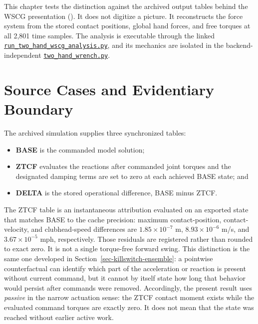\documentclass[
  letterpaper,
]{report}
\providecommand{\tightlist}{%
  \setlength{\itemsep}{0pt}\setlength{\parskip}{0pt}}
\begin{document}
This chapter tests the distinction against the archived output tables
behind the WSCG presentation ().
It does not digitize a picture. It reconstructs the force system from
the stored contact positions, global hand forces, and free torques at
all 2,801 time samples. The analysis is executable through the linked
\href{https://github.com/D-sorganization/UpstreamDrift/blob/main/scripts/research/proximal_distal_energy/run_two_hand_wscg_analysis.py}{\texttt{run\_two\_hand\_wscg\_analysis.py}},
and its mechanics are isolated in the backend-independent
\href{https://github.com/D-sorganization/UpstreamDrift/blob/main/scripts/research/proximal_distal_energy/two_hand_wrench.py}{\texttt{two\_hand\_wrench.py}}.

\section{Source Cases and Evidentiary
Boundary}\label{sec-two-hand-source-cases}

The archived simulation supplies three synchronized tables:

\begin{itemize}
\tightlist
\item
  \textbf{BASE} is the commanded model solution;
\item
  \textbf{ZTCF} evaluates the reactions after commanded joint torques
  and the designated damping terms are set to zero at each achieved BASE
  state; and
\item
  \textbf{DELTA} is the stored operational difference, BASE minus ZTCF.
\end{itemize}

The ZTCF table is an instantaneous attribution evaluated on an exported
state that matches BASE to the cache precision: maximum
contact-position, contact-velocity, and clubhead-speed differences are
\(1.85\times10^{-7}\) m, \(8.93\times10^{-6}\) m/s, and
\(3.67\times10^{-5}\) mph, respectively. Those residuals are registered
rather than rounded to exact zero. It is not a single torque-free
forward swing. This distinction is the same one developed in
Section~\ref{sec-killswitch-ensemble}: a pointwise counterfactual can
identify which part of the acceleration or reaction is present without
current command, but it cannot by itself state how long that behavior
would persist after commands were removed. Accordingly, the present
result uses \emph{passive} in the narrow actuation sense: the ZTCF
contact moment exists while the evaluated command torques are exactly
zero. It does not mean that the state was reached without earlier active
work.
\end{document}
